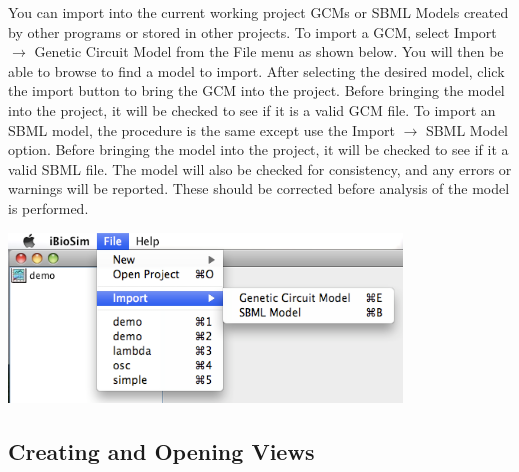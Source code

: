 \documentclass[titlepage,11pt]{article}
\begin{document}
\noindent
You can import into the current working project GCMs
or SBML Models created by other programs or stored in other projects. 
To import a GCM, select Import $\rightarrow$ Genetic Circuit Model
from the File menu as shown below. You will then be able to browse to
find a model to import.  After  selecting the desired model, click the 
import button
to bring the GCM into the project.  Before bringing the model into the 
project, it will be checked to see if it is a valid GCM file.
To import an SBML model, the procedure is the same except use the 
Import $\rightarrow$ SBML Model option.  Before bringing the model
into the project, it will be checked to see if it a valid SBML file.  
The model will also be checked for consistency, and any errors or
warnings will be reported.  These should be corrected before analysis 
of the model is performed.
\begin{center}
\includegraphics[height=45mm]{screenshots/import}
\end{center} 

\subsection{Creating and Opening Views}
\end{document}
